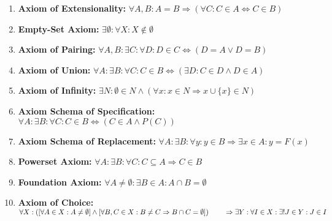 \begin{enumerate}
    \item \textbf{Axiom of Extensionality:} \quad $\forall A, B: A = B \Rightarrow (\forall C: C \in A \Leftrightarrow C \in B)$
    \item \textbf{Empty-Set Axiom:} \quad $\exists \emptyset : \forall X: X \notin \emptyset$
    \item \textbf{Axiom of Pairing:} \quad $\forall A, B: \exists C: \forall D: D \in C \Leftrightarrow (D = A \lor D = B)$
    \item \textbf{Axiom of Union:} \quad $\forall A: \exists B: \forall C: C \in B \Leftrightarrow (\exists D: C \in D \land D \in A)$
    \item \textbf{Axiom of Infinity:} \quad $\exists N: \emptyset \in N \land (\forall x: x \in N \Rightarrow x \cup \{x\} \in N)$
    \item \textbf{Axiom Schema of Specification:} \quad $\forall A: \exists B: \forall C: C \in B \Leftrightarrow (C \in A \land P(C))$
    \item \textbf{Axiom Schema of Replacement:} \quad $\forall A: \exists B: \forall y: y \in B \Rightarrow \exists x \in A: y = F(x)$
    \item \textbf{Powerset Axiom:} \quad $\forall A: \exists B: \forall C: C \subseteq A \Rightarrow C \in B$
    \item \textbf{Foundation Axiom:} \quad $\forall A \ne \emptyset: \exists B \in A: A \cap B = \emptyset$
    \item \textbf{Axiom of Choice:} \quad $\forall X: 
    \left( \left[ \forall A \in X: A \ne \emptyset \right] \land 
    \left[ \forall B, C \in X: B \ne C \Rightarrow B \cap C = \emptyset \right] \right) \\
    \qquad \Rightarrow \exists Y: \forall I \in X: \exists! J \in Y: J \in I$
\end{enumerate}

